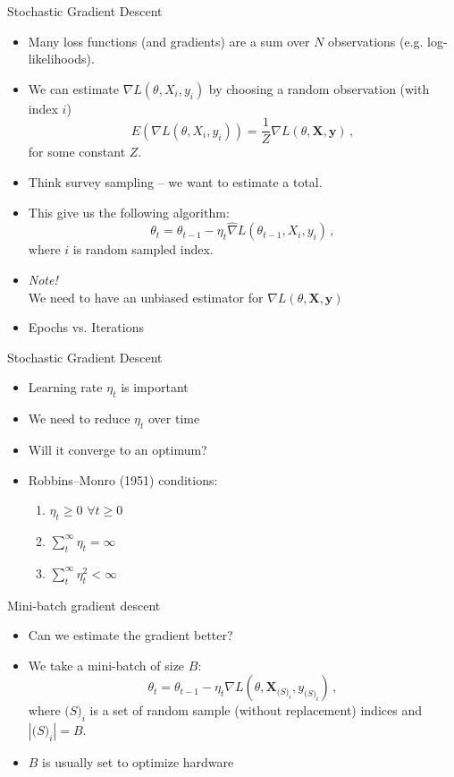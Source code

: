 \documentclass[10pt,handout]{beamer}
\begin{document}
\begin{frame}{Stochastic Gradient Descent}


\begin{itemize}
\item Many loss functions (and gradients) are a sum over $N$ observations (e.g. log-likelihoods).
\item We can estimate $\nabla L(\theta, X_{i}, y_{i})$ by choosing a random observation (with index $i$)
\[
E(\nabla L(\theta, X_{i}, y_{i})) = \frac{1}{Z} \nabla L(\theta, \mathbf{X}, \mathbf{y})\,,
\]
for some constant $Z$.
\item Think survey sampling -- we want to estimate a total.
\item This give us the following algorithm:
\[
\theta_t = \theta_{t-1} - \eta_t \hat{\nabla} L(\theta_{t-1}, X_{i}, y_{i})\,,
\]
where $i$ is random sampled index.
\item \emph{Note!} \\We need to have an unbiased estimator for $\nabla L(\theta, \mathbf{X}, \mathbf{y})$
\item Epochs vs. Iterations
\end{itemize}


\end{frame}


\begin{frame}{Stochastic Gradient Descent}


\begin{itemize}
\item Learning rate $\eta_t$ is important
\item We need to reduce $\eta_t$ over time
\item Will it converge to an optimum?\pause
\item Robbins–Monro (1951) conditions:
\begin{enumerate}
\item $\eta_t \geq 0$ $\forall t \geq 0$
\item $\sum^\infty_t \eta_t = \infty$
\item $\sum^\infty_t \eta_t^2 < \infty$
\end{enumerate}
\end{itemize}

\end{frame}


\begin{frame}{Mini-batch gradient descent}

\begin{itemize}
\item Can we estimate the gradient better?\pause
\item We take a mini-batch of size $B$:
\[
\theta_t = \theta_{t-1} - \eta_t \nabla L(\theta, \mathbf{X}_{\mathcal(S)_i}, y_{\mathcal(S)_i})\,,
\]
where $\mathcal(S)_i$ is a set of random sample (without replacement) indices and $|\mathcal(S)_i| = B$.
\item $B$ is usually set to optimize hardware
\end{itemize}

\end{frame}
\end{document}
